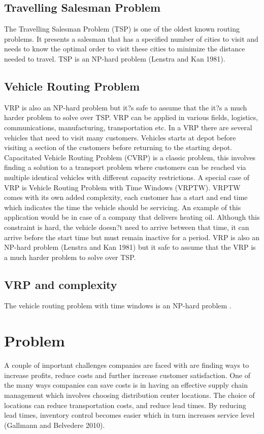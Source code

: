 \documentclass[a4paper,11pt]{article}
\begin{document}
\subsection{Travelling Salesman Problem}
The Travelling Salesman Problem (TSP) is one of the oldest known routing problems. It presents a salesman that has a specified number of cities to visit and needs to know the optimal order to visit these cities to minimize the distance needed to travel. TSP is an NP-hard problem (Lenstra and Kan 1981).

\subsection{Vehicle Routing Problem}
VRP is also an NP-hard problem but it?s safe to assume that the it?s a much harder problem to solve over TSP. VRP can be applied in various fields, logistics, communications, manufacturing, transportation etc. In a VRP there are several vehicles that need to visit many customers. Vehicles starts at depot before visiting a section of the customers before returning to the starting depot. 
Capacitated Vehicle Routing Problem (CVRP) is a classic problem, this involves finding a solution to a transport problem where customers can be reached via multiple identical vehicles with different capacity restrictions. 
A special case of VRP is Vehicle Routing Problem with Time Windows (VRPTW). VRPTW comes with its own added complexity, each customer has a start and end time which indicates the time the vehicle should be servicing. An example of this application would be in case of a company that delivers heating oil. Although this constraint is hard, the vehicle doesn?t need to arrive between that time, it can arrive before the start time but must remain inactive for a period. 
VRP is also an NP-hard problem (Lenstra and Kan 1981) but it safe to assume that the VRP is a much harder problem to solve over TSP. 

\subsection{VRP and complexity}

The vehicle routing problem with time windows is an NP-hard problem \cite{el2010vehicle}.

\section{Problem}
A couple of important challenges companies are faced with are finding ways to increase profits, reduce costs and further increase customer satisfaction. One of the many ways companies can save costs is in having an effective supply chain management which involves choosing distribution center locations. The choice of locations can reduce transportation costs, and reduce lead times. By reducing lead times, inventory control becomes easier which in turn increases service level (Gallmann and Belvedere 2010).
\end{document}
